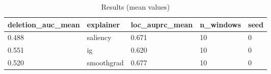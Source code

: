\begin{table}[h]
\centering
\caption{Results (mean values)}
\label{tab:res}
\begin{tabular}{lllll}
\toprule
deletion\_auc\_mean & explainer & loc\_auprc\_mean & n\_windows & seed \\
\midrule
0.488 & saliency & 0.671 & 10 & 0 \\
0.551 & ig & 0.620 & 10 & 0 \\
0.520 & smoothgrad & 0.677 & 10 & 0 \\
\bottomrule
\end{tabular}
\end{table}
